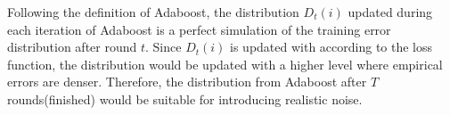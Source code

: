 Following the definition of Adaboost, the distribution $D_t(i)$ updated during each iteration of Adaboost is a perfect simulation of the training error distribution after round $t$.
Since $D_t(i)$ is updated with according to the loss function, the distribution would be updated with a higher level where empirical errors are denser.
Therefore, the distribution from Adaboost after $T$ rounds(finished) would be suitable for introducing realistic noise.


